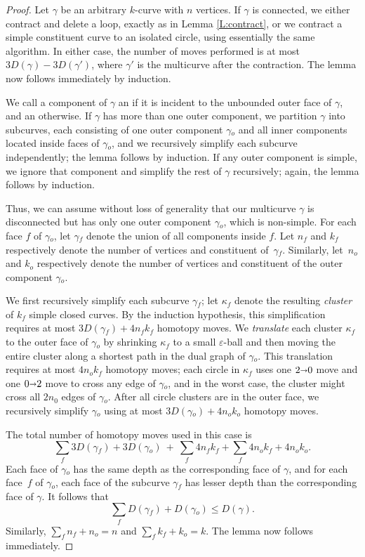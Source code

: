 \documentclass[11pt,twoside]{article}
\def\arcto{\mathord\shortrightarrow}
\def\arc#1#2{#1\arcto#2}
\let\e\varepsilon
\let\EDIT\relax
\numberwithin{figure}{section}
\begin{document}
\begin{proof}
Let $\gamma$ be an arbitrary $k$-curve with $n$ vertices.
If $\gamma$ is connected, we either contract and delete a loop, exactly as in Lemma \ref{L:contract}, or we contract a simple constituent curve to an isolated circle, using essentially the same algorithm.  In either case, the number of moves performed is at most $3D(\gamma) - 3D(\gamma')$, where $\gamma'$ is the multicurve after the contraction.  The lemma now follows immediately by induction.

We call a component of $\gamma$ an  if it is incident to the unbounded outer face of $\gamma$, and an  otherwise.  If $\gamma$ has more than one outer component, we partition $\gamma$ into subcurves, each consisting of one outer component $\gamma\!_o$ and all inner components located inside faces of $\gamma\!_o$, and we recursively simplify each subcurve independently; the lemma follows by induction.  If any outer component is simple, we ignore that component and simplify the rest of $\gamma$ recursively; again, the lemma follows by induction.

Thus, we can assume without loss of generality that our multicurve $\gamma$ is disconnected but has only one outer component $\gamma\!_o$, which is non-simple.  For each face $f$ of $\gamma\!_o$, let $\gamma\!_f$ denote the union of all components inside $f$.  Let $n_f$ and $k_f$ respectively denote the number of vertices and constituent \EDIT{curves} of~$\gamma\!_f$.  Similarly, let~$n_o$ and $k_o$ respectively denote the number of vertices and constituent \EDIT{curves} of the outer component $\gamma\!_o$.

We first recursively simplify each subcurve $\gamma\!_f$; let $\kappa_f$ denote the resulting \emph{cluster} of $k_f$ simple closed curves.  By the induction hypothesis, this simplification requires at most $3D(\gamma\!_f) + 4 n_f k_f$ homotopy moves.  We \emph{translate} each cluster $\kappa_f$ to the outer face of $\gamma\!_o$ by shrinking $\kappa_f$ to a small $\e$-ball and then moving the entire cluster along a shortest path in the dual graph of $\gamma\!_o$.  This translation requires at most $4n_o k_f $ homotopy moves; each circle in $\kappa_f$ uses one $\arc{2}{0}$ move and one $\arc{0}{2}$ move to cross any edge of $\gamma\!_o$, and in the worst case, the cluster might cross all $2n_0$ edges of $\gamma\!_o$.  After all circle clusters are in the outer face, we recursively simplify $\gamma\!_o$ using at most $3 D(\gamma\!_o) + 4 n_o k_o$ homotopy moves.  

The total number of homotopy moves used in this case is
\[
	\sum_f 3D(\gamma\!_f) + 3 D(\gamma\!_o)
	~+~
	\sum_f 4 n_f k_f + \sum_f 4 n_o k_f + 4 n_o k_o.
\]
Each face of $\gamma\!_o$ has the same depth as the corresponding face of $\gamma$, and for each face~$f$ of $\gamma\!_o$, each face of the subcurve $\gamma\!_f$ has lesser depth than the corresponding face of $\gamma$.  It follows that 
\[
	\sum_f D(\gamma\!_f) + D(\gamma\!_o) \le D(\gamma).
\]
Similarly, $\sum_f n_f + n_o = n$ and $\sum_f k_f + k_o = k$.  The lemma now follows immediately.
\end{proof}
\end{document}
